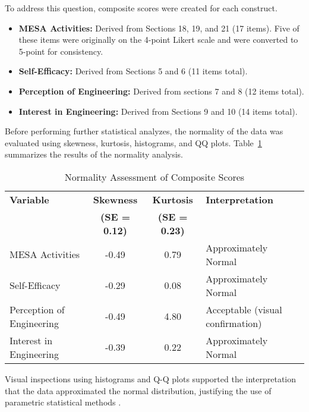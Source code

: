 \documentclass[11pt]{article}
\begin{document}
To address this question, composite scores were created for each construct.

\begin{itemize}
    \item \textbf{MESA Activities:} Derived from Sections 18, 19, and 21 (17 items). Five of these items were originally on the 4-point Likert scale and were converted to 5-point for consistency.
    \item \textbf{Self-Efficacy:} Derived from Sections 5 and 6 (11 items total).
    \item \textbf{Perception of Engineering:} Derived from sections 7 and 8 (12 items total).
    \item \textbf{Interest in Engineering:} Derived from Sections 9 and 10 (14 items total).
\end{itemize}

Before performing further statistical analyzes, the normality of the data was evaluated using skewness, kurtosis, histograms, and QQ plots. Table~\ref{tab:normality} summarizes the results of the normality analysis.

\begin{table}[h]
\centering
\small
\begin{tabular}{p{3.5cm} c c p{4.5cm}}
\hline
\textbf{Variable} & \textbf{Skewness} & \textbf{Kurtosis} & \textbf{Interpretation} \\
                  & \textbf{(SE = 0.12)} & \textbf{(SE = 0.23)} &  \\
\hline
MESA Activities           & -0.49 & 0.79  & Approximately Normal \\
Self-Efficacy             & -0.29 & 0.08  & Approximately Normal \\
Perception of Engineering & -0.49 & 4.80  & Acceptable (visual confirmation) \\
Interest in Engineering   & -0.39 & 0.22  & Approximately Normal \\
\hline
\end{tabular}
\caption{Normality Assessment of Composite Scores}
\label{tab:normality}
\end{table}


Visual inspections using histograms and Q-Q plots supported the interpretation that the data approximated the normal distribution, justifying the use of parametric statistical methods \cite{bulmer1979}.
\end{document}
